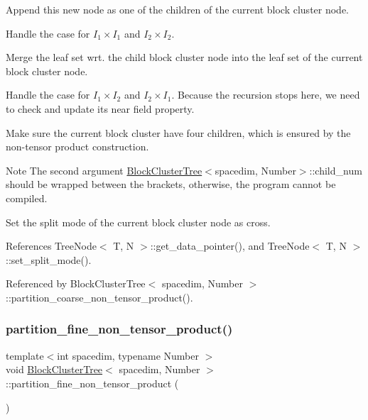 Append this new node as one of the children of the current block cluster node.

Handle the case for $I_1 \times I_1$ and $I_2 \times I_2$.

Merge the leaf set wrt. the child block cluster node into the leaf set of the current block cluster node.

Handle the case for $I_1 \times I_2$ and $I_2 \times I_1$. Because the recursion stops here, we need to check and update its near field property.

Make sure the current block cluster have four children, which is ensured by the non-\/tensor product construction.


\begin{DoxyDescription}
\item[Note ]The second argument {\ttfamily \hyperlink{classBlockClusterTree}{Block\+Cluster\+Tree}$<$spacedim}, Number$>$\+::child\+\_\+num should be wrapped between the brackets, otherwise, the program cannot be compiled. 
\end{DoxyDescription}

Set the split mode of the current block cluster node as cross.

References Tree\+Node$<$ T, N $>$\+::get\+\_\+data\+\_\+pointer(), and Tree\+Node$<$ T, N $>$\+::set\+\_\+split\+\_\+mode().



Referenced by Block\+Cluster\+Tree$<$ spacedim, Number $>$\+::partition\+\_\+coarse\+\_\+non\+\_\+tensor\+\_\+product().

\mbox{\label{classBlockClusterTree_ac6d23af20c52c7b32eb080bd54556206}} 
\subsubsection{\texorpdfstring{partition\+\_\+fine\+\_\+non\+\_\+tensor\+\_\+product()}{partition\_fine\_non\_tensor\_product()}}
{\footnotesize\ttfamily template$<$int spacedim, typename Number $>$ \\
void \hyperlink{classBlockClusterTree}{Block\+Cluster\+Tree}$<$ spacedim, Number $>$\+::partition\+\_\+fine\+\_\+non\+\_\+tensor\+\_\+product (\begin{DoxyParamCaption}{ }\end{DoxyParamCaption})}

